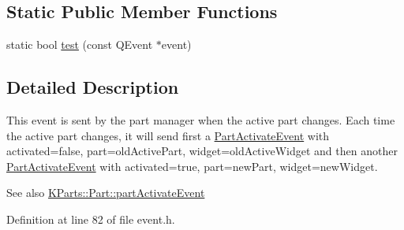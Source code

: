 \subsection*{\-Static \-Public \-Member \-Functions}
\begin{DoxyCompactItemize}
\item 
static bool \hyperlink{classKParts_1_1PartActivateEvent_ab2b795f3ff5ed09524e0357ee21cf264}{test} (const \-Q\-Event $\ast$event)
\end{DoxyCompactItemize}


\subsection{\-Detailed \-Description}
\-This event is sent by the part manager when the active part changes. \-Each time the active part changes, it will send first a \hyperlink{classKParts_1_1PartActivateEvent}{\-Part\-Activate\-Event} with activated=false, part=old\-Active\-Part, widget=old\-Active\-Widget and then another \hyperlink{classKParts_1_1PartActivateEvent}{\-Part\-Activate\-Event} with activated=true, part=new\-Part, widget=new\-Widget. \begin{DoxySeeAlso}{\-See also}
\hyperlink{classKParts_1_1Part_ad848641dbb38a3b2404b2ad554a08fba}{\-K\-Parts\-::\-Part\-::part\-Activate\-Event} 
\end{DoxySeeAlso}


\-Definition at line 82 of file event.\-h.



